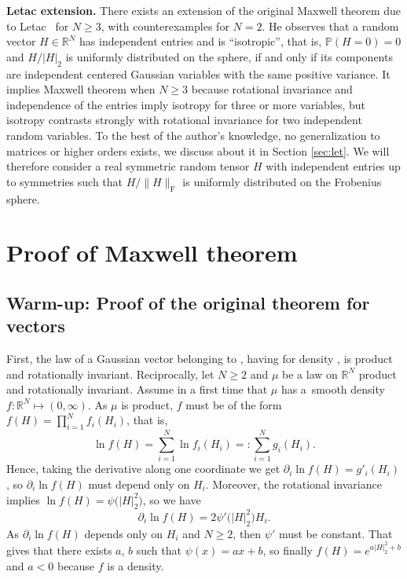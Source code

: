 \documentclass[pdftex]{sigma}
\numberwithin{equation}{section}
\theoremstyle{definition}
\begin{document}
{\bf Letac extension.}
There exists an extension of the original Maxwell theorem due to Le\-tac~\cite{letac} for $N\geq 3$, with counterexamples for $N=2$. He observes that a random vector $H \in \mathbb{R}^N$ has independent entries and is ``isotropic'', that is, $\mathbb{P}(H=0)=0$ and $H/\vert H\vert_2$ is uniformly distributed on the sphere, if and only if its components are independent centered Gaussian variables with the same positive variance. It implies Maxwell theorem when $N\geq 3$ because rotational invariance and independence of the entries imply isotropy for three or more variables, but isotropy contrasts strongly with rotational invariance for two independent random variables. To the best of the author's knowledge, no generalization to matrices or higher orders exists, we discuss about it in Section \ref{sec:let}. We will therefore consider a real symmetric random tensor $H$ with independent entries up to symmetries such that $H / \| H \|_{\mathrm{F}}$ is uniformly distributed on the Frobenius sphere.


\section{Proof of Maxwell theorem}

\subsection{Warm-up: Proof of the original theorem for vectors}\label{vector}

First, the law of a Gaussian vector belonging to , having for density , is product and rotationally invariant. Reciprocally, let $N\geq 2$ and $\mu$ be a law on $\mathbb{R}^N$ product and rotationally invariant. Assume in a first time that $\mu$ has a~smooth density $f\colon \mathbb{R}^N \mapsto (0,\infty)$. As $\mu$ is product, $f$ must be of the form $f(H)=\prod_{i=1}^N f_i(H_i)$, that is,
\[ \ln f(H) = \sum_{i=1}^N \ln f_i(H_i) =: \sum_{i=1}^N g_i(H_i).\]
Hence, taking the derivative along one coordinate we get
$\partial_i \ln f(H) = g'_i(H_i)$,
so $\partial_i \ln f(H)$ must depend only on $H_i$. Moreover, the rotational invariance implies $\ln f(H)=\psi \bigl(\vert H \vert^2_2\bigr)$, so we have
\[ \partial_i \ln f(H) = 2 \psi'\bigl(\vert H \vert^2_2\bigr) H_i.\]
As $\partial_i \ln f(H)$ depends only on $H_i$ and $N \geq 2$, then $\psi'$ must be constant. That gives that there exists $a$, $b$ such that $\psi(x)=ax+b$, so finally $f(H)=e^{a \vert H \vert_2^2+b}$ and $a<0$ because $f$ is a density.
\end{document}
